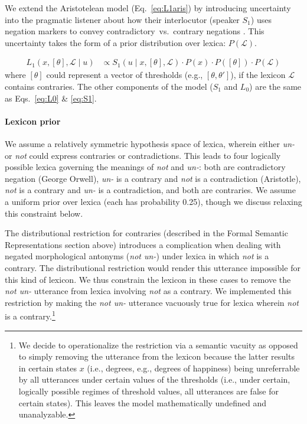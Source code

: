 \documentclass[floatsintext,doc]{apa6}
\let\oldparagraph\paragraph
\renewcommand{\paragraph}[1]{\oldparagraph{#1}\mbox{}}
\let\rmarkdownfootnote\footnote%
\def\footnote{\protect\rmarkdownfootnote}
\begin{document}
We extend the Aristotelean model (Eq.~\ref{eq:L1aris}) by introducing uncertainty into the pragmatic listener about how their interlocutor (speaker $S_1$) uses negation markers to convey contradictory~vs.~contrary negations \cite{Bergen2016}.
This uncertainty takes the form of a prior distribution over lexica: $P(\mathcal{L})$.

\begin{align}
L_{1}(x, [\theta], \mathcal{L} \mid u) &\propto S_{1}(u \mid x, [\theta], \mathcal{L}) \cdot P(x) \cdot  P([\theta]) \cdot P(\mathcal{L}) \label{eq:L1a}
\end{align}
% 
where $[\theta]$ could represent a vector of thresholds (e.g., $[\theta, \theta']$), if the lexicon $\mathcal{L}$ contains contraries.
The other components of the model ($S_1$ and $L_0$) are the same as Eqs.~\ref{eq:L0} \& \ref{eq:S1}.

\paragraph{Lexicon prior}
%
We assume a relatively symmetric hypothesis space of lexica, wherein either \emph{un-} or \emph{not} could express contraries or contradictions. 
This leads to four logically possible lexica governing the meanings of \emph{not} and \emph{un-}: both are contradictory negation (George Orwell), \emph{un-} is a contrary and \emph{not} is a contradiction (Aristotle), \emph{not} is a contrary and \emph{un-} is a contradiction, and both are contraries. 
We assume a uniform prior over lexica (each has probability 0.25), though we discuss relaxing this constraint below. 



The distributional restriction for contraries (described in the Formal Semantic Representations section above) introduces a complication when dealing with negated morphological antonyms (\emph{not un-})  under lexica in which \emph{not} is a contrary. 
 The distributional restriction would render this utterance impossible for this kind of lexicon.
We thus constrain the lexicon in these cases to remove the \emph{not un-} utterance from lexica involving \emph{not} as a contrary. 
We implemented this restriction by making the \emph{not un-} utterance vacuously true for lexica wherein \emph{not} is a contrary.\footnote{We decide to operationalize the restriction via a semantic vacuity as opposed to simply removing the utterance from the lexicon because the latter results in certain states $x$ (i.e., degrees, e.g., degrees of happiness) being unreferrable by all utterances under certain values of the thresholds (i.e., under certain, logically possible regimes of threshold values, all utterances are false for certain states). This leaves the model mathematically undefined and unanalyzable.}
\end{document}
